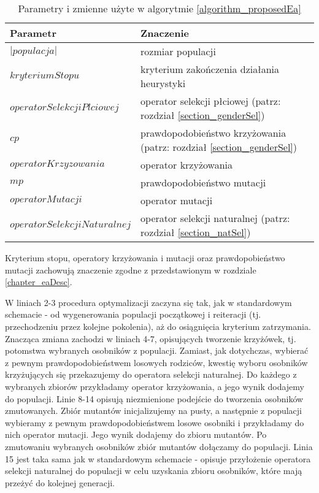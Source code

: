 \documentclass[twoside]{iisthesis}
\begin{document}
\begin{table}
	\caption{Parametry i zmienne użyte w algorytmie \ref{algorithm_proposedEa}}
	\label{table_proposedEa}
	\begin{tabularx}{\linewidth}{lX}
		\hline
		\textbf{Parametr} & \textbf{Znaczenie} \\
		\hline
		\hline
		$|populacja|$ & rozmiar populacji \\
		\hline
		$kryteriumStopu$ & kryterium zakończenia działania heurystyki \\
		\hline
		$operatorSelekcjiPlciowej$ & operator selekcji płciowej (patrz: rozdział \ref{section_genderSel}) \\
		\hline
		$cp$ & prawdopodobieństwo krzyżowania (patrz: rozdział \ref{section_genderSel}) \\
		\hline
		$operatorKrzyzowania$ & operator krzyżowania \\
		\hline
		$mp$ & prawdopodobieństwo mutacji \\
		\hline
		$operatorMutacji$ & operator mutacji \\
		\hline
		$operatorSelekcjiNaturalnej$ & operator selekcji naturalnej (patrz: rozdział \ref{section_natSel}) \\
		\hline
	\end{tabularx}
\end{table}

Kryterium stopu, operatory krzyżowania i mutacji oraz prawdopobieństwo mutacji zachowują znaczenie zgodne z przedstawionym w rozdziale \ref{chapter_eaDesc}.

W liniach 2-3 procedura optymalizacji zaczyna się tak, jak w standardowym schemacie - od wygenerowania populacji początkowej i reiteracji (tj. przechodzeniu przez kolejne pokolenia), aż do osiągnięcia kryterium zatrzymania.
Znacząca zmiana zachodzi w liniach 4-7, opisujących tworzenie krzyżówek, tj. potomstwa wybranych osobników z populacji. Zamiast, jak dotychczas, wybierać z pewnym prawdopodobieństwem losowych rodziców, kwestię wyboru osobników krzyżujących się przekazujemy do operatora selekcji naturalnej. Do każdego z wybranych zbiorów przykładamy operator krzyżowania, a jego wynik dodajemy do populacji.
Linie 8-14 opisują niezmienione podejście do tworzenia osobników zmutowanych. Zbiór mutantów inicjalizujemy na pusty, a następnie z populacji wybieramy z pewnym prawdopodobieństwem losowe osobniki i przykładamy do nich operator mutacji. Jego wynik dodajemy do zbioru mutantów. Po zmutowaniu wybranych osobników zbiór mutantów dołączamy do populacji.
Linia 15 jest taka sama jak w standardowym schemacie - opisuje przyłożenie operatora selekcji naturalnej do populacji w celu uzyskania zbioru osobników, które mają przeżyć do kolejnej generacji.
\end{document}
